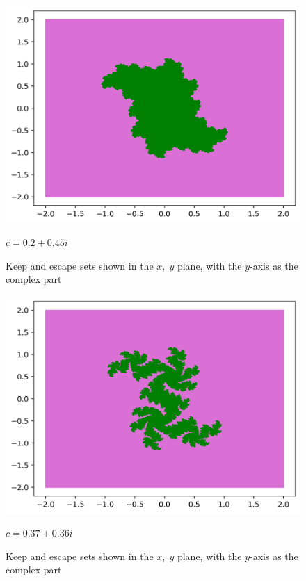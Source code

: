 \documentclass[12pt]{article}
\begin{document}
\begin{figure}[H]
	\begin{minipage}{0.725\textwidth}
		\hfill
		\includegraphics[scale=0.6]{02i045.png}
	\end{minipage}
	\hfill
	\begin{minipage}{0.2\textwidth}
		$c=0.2+0.45i$
	\end{minipage}
	\caption{Keep and escape sets shown in the $x,\;y$ plane, with the $y$-axis as the complex part}
	\label{fig:mobAsmp}
\end{figure}
\begin{figure}[H]
	\begin{minipage}{0.725\textwidth}
		\hfill
		\includegraphics[scale=0.6]{037i036.png}
	\end{minipage}
	\hfill
	\begin{minipage}{0.2\textwidth}
		$c=0.37+0.36i$
	\end{minipage}
	\caption{Keep and escape sets shown in the $x,\;y$ plane, with the $y$-axis as the complex part}
	\label{fig:mobAsmp}
\end{figure}
\end{document}
